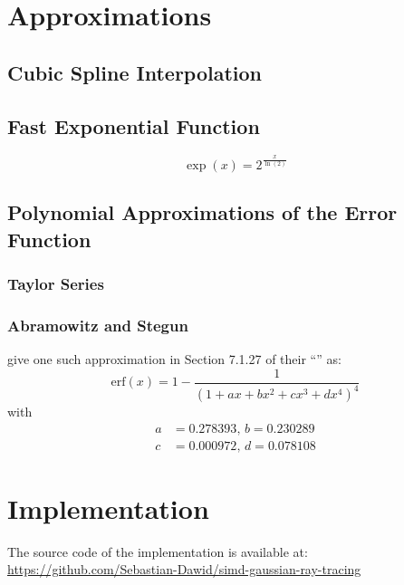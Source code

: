 \documentclass[a4paper, 11pt]{memoir}
\newcommand*{\erf}{\text{erf}}
\begin{document}
    \chapter{Approximations}
    \section{Cubic Spline Interpolation}

    \section{Fast Exponential Function}
    \cite{fast_exp}
    \begin{equation}
        \exp{(x)} = 2^{\frac{x}{\ln{(2)}}}
    \end{equation}
    
    \section{Polynomial Approximations of the Error Function}
    \subsection{Taylor Series}
    \subsection{Abramowitz and Stegun}
    \citeauthor{AbraSteg72} give one such approximation in Section 7.1.27 of their \enquote{}\cite{AbraSteg72} as:
    \begin{equation}
        \erf{(x)} = 1 - \frac{1}{(1 + ax + bx^2 + cx^3 + dx^4)^4}
    \end{equation}
    with
    \begin{align*}
        a &= 0.278393,\,
        b = 0.230289\\
        c &= 0.000972,\,
        d = 0.078108
    \end{align*}
    
    \chapter{Implementation}
    \label{ch:implementation}
    The source code of the implementation is available at: \href{https://github.com/Sebastian-Dawid/simd-gaussian-ray-tracing}{https://github.com/Sebastian-Dawid/simd-gaussian-ray-tracing}
\end{document}
